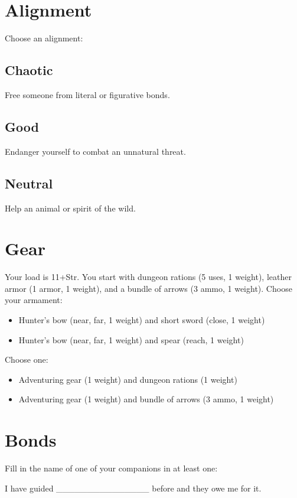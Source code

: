 \section{Alignment}


 Choose an alignment:
\subsection{Chaotic}


 Free someone from literal or figurative bonds.
\subsection{Good}


 Endanger yourself to combat an unnatural threat.
\subsection{Neutral}


 Help an animal or spirit of the wild.
\section{Gear}


 Your load is 11+Str. You start with dungeon rations (5 uses, 1 weight), leather armor (1 armor, 1 weight), and a bundle of arrows (3 ammo, 1 weight). Choose your armament:
\begin{itemize}
\item Hunter's bow (near, far, 1 weight) and short sword (close, 1 weight)
\item Hunter's bow (near, far, 1 weight) and spear (reach, 1 weight)

\end{itemize}


 Choose one:
\begin{itemize}
\item Adventuring gear (1 weight) and dungeon rations (1 weight)
\item Adventuring gear (1 weight) and bundle of arrows (3 ammo, 1 weight)

\end{itemize}
\section{Bonds}


 Fill in the name of one of your companions in at least one:


 I have guided \_\_\_\_\_\_\_\_\_\_\_\_\_\_\_ before and they owe me for it.


